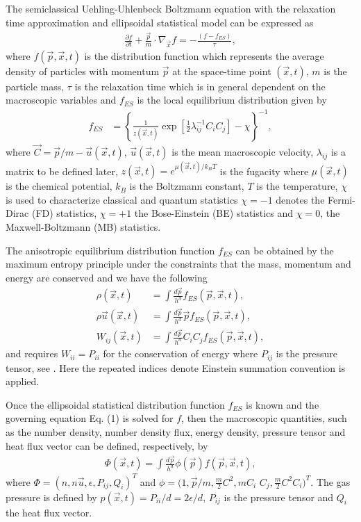 \documentclass[doublecol]{epl2}
\begin{document}
The semiclassical Uehling-Uhlenbeck Boltzmann equation with the relaxation time approximation and ellipsoidal statistical model can be expressed as
\begin{align}
\frac{\partial f}{\partial t} + \frac{\vec p}{m} \cdot \nabla_{\vec x} f  =  -\frac{(f - f_{ES})}{\tau},
\end{align}
where  $f(\vec p, \vec x, t)$ is the distribution function which represents the average density of particles with momentum $\vec p$ at the space-time point $(\vec x, t)$, $m$ is the particle mass, $\tau$ is the relaxation time which is in general dependent on the macroscopic variables and $f_{ES}$ is the local equilibrium distribution given by
\begin{align}
f_{ES} &=\left\{ \frac{1}{z(\vec x,t)} \exp[ \frac{1}{2} \lambda_{i j}^{-1} C_{i} C_{j} ] - \chi \right\}^{-1},
\end{align}
where $\vec C=\vec p/m -\vec u(\vec x,t)$, $\vec u(\vec x,t)$ is the mean macroscopic velocity, $\lambda_{i j}$ is a matrix to be defined later, $z(\vec x, t)= e^{ \mu(\vec x, t) /k_B T }$ is the fugacity where $\mu(\vec x,t)$ is the chemical potential, $k_B$ is the Boltzmann constant, $T$ is the temperature, $\chi$ is used to characterize classical and quantum statistics $\chi = -1$ denotes the Fermi-Dirac (FD) statistics, $\chi = +1$ the Bose-Einstein (BE) statistics and $\chi = 0$, the Maxwell-Boltzmann (MB) statistics.

The anisotropic equilibrium distribution function $f_{ES}$ can be obtained by the maximum entropy principle under the constraints that the mass, momentum and energy are conserved and we have the following
\begin{align}
\rho(\vec x, t) &= \int \frac{d \vec p}{h^d}   f_{ES}(\vec p, \vec x, t), \\
\rho \vec u(\vec x, t) &= \int \frac{d \vec p}{h^d} \vec p  f_{ES}(\vec p, \vec x, t), \\
W_{i j}(\vec x, t) &= \int \frac{d \vec p}{h^d} C_{i} C_{j} f_{ES}(\vec p, \vec x, t),
\end{align}
and requires $W_{i i}=P_{i i}$ for the conservation of energy where $P_{ij}$ is the pressure tensor, see \cite{Wu2012}.  Here the repeated indices denote Einstein summation convention is applied.

Once the ellipsoidal statistical distribution function $f_{ES}$ is known and the governing equation Eq. (1) is solved for $f$, then the macroscopic quantities, such as the number density, number density flux, energy density, pressure tensor and heat flux vector can be defined, respectively, by
\begin{align}
\Phi (\vec x, t) = \int \frac{d \vec p }{ h^d} \phi(\vec p) f(\vec p, \vec x, t),
\end{align}
where $\Phi = (n, n\vec u, \epsilon, P_{ij}, Q_{i})^T$ and $\phi = (1, \vec p/m, \frac{m}{2} C^2, m C_{i} $ $C_{j}, \frac{m}{2}C^2 C_{i} )^T$.  The gas pressure is defined by $p(\vec x, t) = P_{i i}/d = 2 \epsilon /d$, $P_{ij}$ is the pressure tensor and $Q_{i}$ the heat flux vector.
\end{document}

